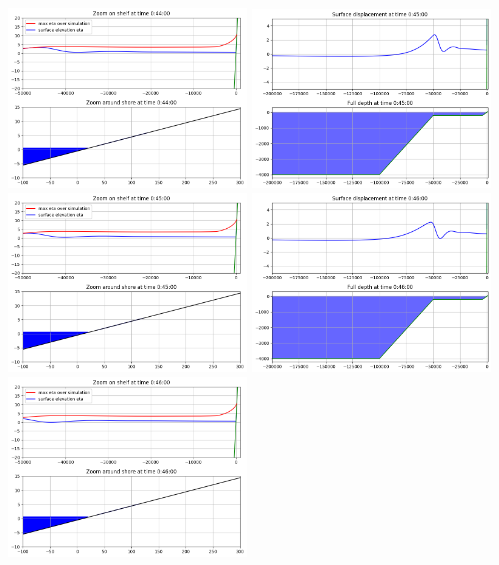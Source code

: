 \documentclass[11pt]{article}
\begin{document}
\includegraphics[width=0.475\textwidth]{frame0044fig1.png}
\vskip 10pt 
\includegraphics[width=0.475\textwidth]{frame0045fig0.png}
\includegraphics[width=0.475\textwidth]{frame0045fig1.png}
\vskip 10pt 
\includegraphics[width=0.475\textwidth]{frame0046fig0.png}
\includegraphics[width=0.475\textwidth]{frame0046fig1.png}
\end{document}
